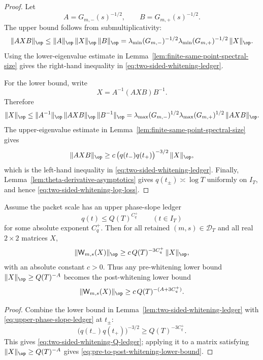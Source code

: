 \begin{proof}
Let
\[
        A=G_{m,-}(s)^{-1/2},\qquad B=G_{m,+}(s)^{-1/2}.
\]
The upper bound follows from submultiplicativity:
\[
        \|AXB\|_{\op}
        \le \|A\|_{\op}\,\|X\|_{\op}\,\|B\|_{\op}
        = \lambda_{\min}(G_{m,-})^{-1/2}
          \lambda_{\min}(G_{m,+})^{-1/2}\,\|X\|_{\op}.
\]
Using the lower-eigenvalue estimate in
Lemma~\ref{lem:finite-same-point-spectral-size} gives the right-hand
inequality in \eqref{eq:two-sided-whitening-ledger}.

For the lower bound, write
\[
        X=A^{-1}(AXB)B^{-1}.
\]
Therefore
\[
        \|X\|_{\op}
        \le \|A^{-1}\|_{\op}\,\|AXB\|_{\op}\,\|B^{-1}\|_{\op}
        =\lambda_{\max}(G_{m,-})^{1/2}
         \lambda_{\max}(G_{m,+})^{1/2}\,\|AXB\|_{\op}.
\]
The upper-eigenvalue estimate in
Lemma~\ref{lem:finite-same-point-spectral-size} gives
\[
        \|AXB\|_{\op}
        \ge
        c\,\bigl(q(t_-)q(t_+)\bigr)^{-3/2}\,
        \|X\|_{\op},
\]
which is the left-hand inequality in
\eqref{eq:two-sided-whitening-ledger}.  Finally,
Lemma~\ref{lem:theta-derivative-asymptotics} gives
\(q(t_\pm)\asymp\log T\) uniformly on \(I_T\), and hence
\eqref{eq:two-sided-whitening-log-loss}.
\end{proof}

\begin{corollary}
\label{cor:two-sided-whitening-polynomial-ledger}
Assume the packet scale has an upper phase-slope ledger
\begin{equation}
\label{eq:upper-phase-slope-ledger}
        q(t)\le Q(T)^{C_q^+}
        \qquad (t\in I_T)
\end{equation}
for some absolute exponent \(C_q^+\).  Then for all retained
\((m,s)\in\mathcal D_T\) and all real \(2\times2\) matrices \(X\),
\begin{equation}
\label{eq:two-sided-whitening-Q-ledger}
        \|\mathsf W_{m,s}(X)\|_{\op}
        \ge
        c\,Q(T)^{-3C_q^+}\,\|X\|_{\op},
\end{equation}
with an absolute constant \(c>0\).  Thus any pre-whitening lower bound
\(\|X\|_{\op}\ge Q(T)^{-A}\) becomes the post-whitening lower bound
\begin{equation}
\label{eq:pre-to-post-whitening-lower-bound}
        \|\mathsf W_{m,s}(X)\|_{\op}
        \ge c\,Q(T)^{-(A+3C_q^+)}.
\end{equation}
\end{corollary}

\begin{proof}
Combine the lower bound in Lemma~\ref{lem:two-sided-whitening-ledger} with
\eqref{eq:upper-phase-slope-ledger} at \(t_\pm\):
\[
        \bigl(q(t_-)q(t_+)\bigr)^{-3/2}
        \ge Q(T)^{-3C_q^+}.
\]
This gives \eqref{eq:two-sided-whitening-Q-ledger}; applying it to a
matrix satisfying \(\|X\|_{\op}\ge Q(T)^{-A}\) gives
\eqref{eq:pre-to-post-whitening-lower-bound}.
\end{proof}

